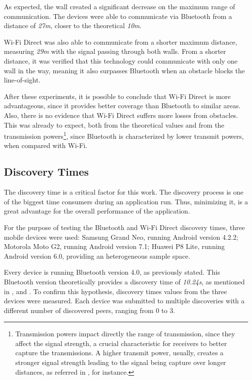 As expected, the wall created a significant decrease on the maximum range of communication. The devices were able to communicate via Bluetooth from a distance of \textit{27m}, closer to the theoretical \textit{10m}.

Wi-Fi Direct was also able to communicate from a shorter maximum distance, measuring \textit{29m} with the signal passing through both walls. From a shorter distance, it was verified that this technology could communicate with only one wall in the way, meaning it also surpasses Bluetooth when an obstacle blocks the line-of-sight.

After these experiments, it is possible to conclude that Wi-Fi Direct is more advantageous, since it provides better coverage than Bluetooth to similar areas. Also, there is no evidence that Wi-Fi Direct suffers more losses from obstacles. This was already to expect, both from the theoretical values and from the transmission powers\footnote{Transmission powers impact directly the range of transmission, since they affect the signal strength, a crucial characteristic for receivers to better capture the transmissions. A higher transmit power, usually, creates a stronger signal strength leading to the signal being capture over longer distances, as referred in \cite{txpower}, for instance.}, since Bluetooth is characterized by lower transmit powers, when compared with Wi-Fi.

\subsection{Discovery Times}
\label{subsec:normaldisc}

The discovery time is a critical factor for this work. The discovery process is one of the biggest time consumers during an application run. Thus, minimizing it, is a great advantage for the overall performance of the application.

For the purpose of testing the Bluetooth and Wi-Fi Direct discovery times, three mobile devices were used: Samsung Grand Neo, running Android version 4.2.2; Motorola Moto G2, running Android version 7.1; Huawei P8 Lite, running Android version 6.0, providing an heterogeneous sample space.

Every device is running Bluetooth version 4.0, as previously stated. This Bluetooth version theoretically provides a discovery time of \textit{10.24s}, as mentioned in \cite{bluetoothspec}, \cite{btdisc1} and \cite{btdisc2}. To confirm this hypothesis, discovery times values from the three devices were measured. Each device was submitted to multiple discoveries with a different number of discovered peers, ranging from 0 to 3.

